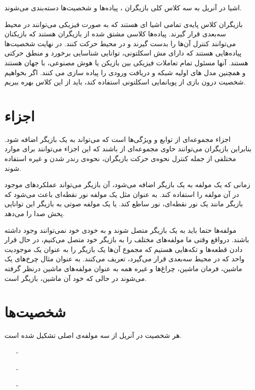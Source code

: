 اشیا در آنریل به سه کلاس کلی بازیگران
، پیاده‌ها 
و شخصیت‌ها
دسته‌بندی می‌شوند.

بازیگران کلاس پایه‌ی تمامی اشیا ای هستند که به صورت فیزیکی می‌توانند در محیط سه‌بعدی قرار گیرند.
پیاده‌ها کلاسی مشتق شده از بازیگران هستند که بازیکنان می‌توانند کنترل آن‌ها را بدست گیرند و 
در محیط حرکت کنند.
 در نهایت شخصیت‌ها پیاده‌هایی هستند که دارای مش اسکلتونی، توانایی شناسایی برخورد و منطق حرکتی هستند.
 آنها مسئول تمام تعاملات فیزیکی بین بازیکن یا هوش مصنوعی، با جهان هستند و همچنین مدل های اولیه شبکه و دریافت ورودی را پیاده سازی می کنند. 
اگر بخواهیم شخصیت درون بازی از پویانمایی اسکلتونی استفاده کند، باید از این کلاس بهره ببریم.

\section{اجزاء}

اجزاء
مجموعه‌ای از توابع و ویژگی‌ها است که می‌تواند به یک بازیگر اضافه شود.
بنابراین بازیگران می‌توانند حاوی مجموعه‌ای از
باشند که این اجزاء می‌توانند برای موارد مختلفی از جمله
کنترل نحوه‌ی حرکت بازیگران، 
نحوه‌ی رندر شدن و غیره استفاده شوند.

زمانی که یک مولفه به یک بازیگر اضافه می‌شود، آن بازیگر می‌تواند عملکرد‌های موجود در آن مولفه را استفاده کند.
به عنوان مثل یک مولفه نور نقطه‌ای باعث می‌شود که بازیگر مانند یک نور نقطه‌ای، نور ساطع کند.
یا یک مولفه صوتی به بازیگر این توانایی پخش صدا را می‌دهد.

مولفه‌ها حتما باید به یک بازیگر متصل شوند و به خودی خود نمی‌توانند وجود داشته باشند.
درواقع وقتی ما مولفه‌های مختلف را به بازیگر خود متصل می‌کنیم، در حال قرار دادن قطعه‌ها و تکه‌هایی هستیم
 که مجموع آن‌ها یک بازیگر را به عنوان یک موجودیت واحد که در محیط سه‌بعدی قرار می‌گیرد، تعریف می‌کنند.
 به عنوان مثال چرخ‌های یک ماشین، فرمان ماشین، چراغ‌ها و غیره همه به عنوان
 مولفه‌های ماشین درنظر گرفته می‌شوند در حالی که خود آن ماشین، بازیگر است.

\section{شخصیت‌ها}

هر شخصیت در آنریل از سه مولفه‌ی اصلی تشکیل شده است.


\begin{itemize}
	\item[-] 
	\item[-] 
	\item[-] 
\end{itemize}


